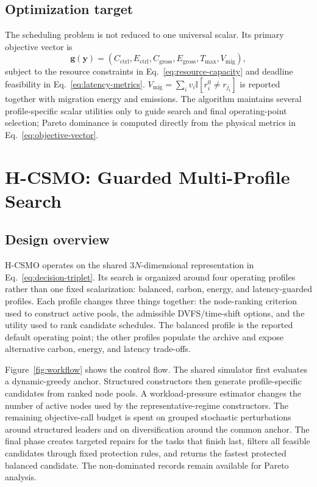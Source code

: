 \documentclass[preprint,12pt]{elsarticle}
\newcommand{\method}{H-CSMO\xspace}
\begin{document}
\subsection{Optimization target}

The scheduling problem is not reduced to one universal scalar. Its primary objective vector is
\begin{equation}
\mathbf{g}(\mathbf{y})=
\left(C_{\mathrm{ctrl}},E_{\mathrm{ctrl}},C_{\mathrm{gross}},E_{\mathrm{gross}},T_{\max},V_{\mathrm{mig}}\right),
\label{eq:objective-vector}
\end{equation}
subject to the resource constraints in Eq.~\eqref{eq:resource-capacity} and deadline feasibility in Eq.~\eqref{eq:latency-metrics}. $V_{\mathrm{mig}}=\sum_i v_i\mathbb{I}[r_i^0\neq r_{j_i}]$ is reported together with migration energy and emissions. The algorithm maintains several profile-specific scalar utilities only to guide search and final operating-point selection; Pareto dominance is computed directly from the physical metrics in Eq.~\eqref{eq:objective-vector}.
\section{H-CSMO: Guarded Multi-Profile Search}
\label{sec:method}

\subsection{Design overview}

\method operates on the shared $3N$-dimensional representation in Eq.~\eqref{eq:decision-triplet}. Its search is organized around four operating profiles rather than one fixed scalarization: balanced, carbon, energy, and latency-guarded profiles. Each profile changes three things together: the node-ranking criterion used to construct active pools, the admissible DVFS/time-shift options, and the utility used to rank candidate schedules. The balanced profile is the reported default operating point; the other profiles populate the archive and expose alternative carbon, energy, and latency trade-offs.

Figure~\ref{fig:workflow} shows the control flow. The shared simulator first evaluates a dynamic-greedy anchor. Structured constructors then generate profile-specific candidates from ranked node pools. A workload-pressure estimator changes the number of active nodes used by the representative-regime constructors. The remaining objective-call budget is spent on grouped stochastic perturbations around structured leaders and on diversification around the common anchor. The final phase creates targeted repairs for the tasks that finish last, filters all feasible candidates through fixed protection rules, and returns the fastest protected balanced candidate. The non-dominated records remain available for Pareto analysis.
\end{document}
